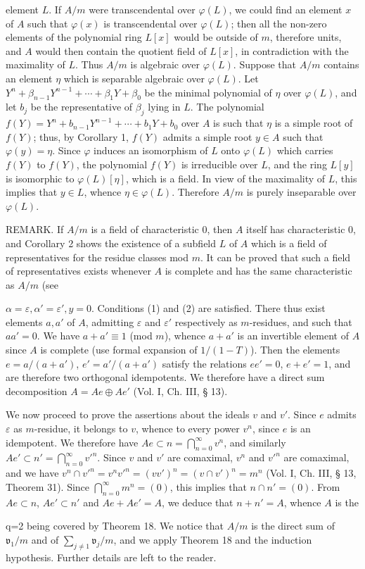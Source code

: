 element $L$. If $A/m$ were transcendental over $\varphi(L)$, we could find an element $x$ of $A$ such that $\varphi(x)$ is transcendental over $\varphi(L)$; then all the non-zero elements of the polynomial ring $L[x]$ would be outside of $m$, therefore units, and $A$ would then contain the quotient field of $L[x]$, in contradiction with the maximality of $L$. Thus $A/m$ is algebraic over $\varphi(L)$. Suppose that $A/m$ contains an element $\eta$ which is separable algebraic over $\varphi(L)$. Let $Y^n + \beta_{n-1} Y^{n-1} + \cdots + \beta_1 Y + \beta_0$ be the minimal polynomial of $\eta$ over $\varphi(L)$, and let $b_j$ be the representative of $\beta_j$ lying in $L$. The polynomial $f(Y) = Y^n + b_{n-1} Y^{n-1} + \cdots + b_1 Y + b_0$ over $A$ is such that $\eta$ is a simple root of $f(Y)$; thus, by Corollary 1, $f(Y)$ admits a simple root $y \in A$ such that $\varphi(y) = \eta$. Since $\varphi$ induces an isomorphism of $L$ onto $\varphi(L)$ which carries $f(Y)$ to $f(Y)$, the polynomial $f(Y)$ is irreducible over $L$, and the ring $L[y]$ is isomorphic to $\varphi(L)[\eta]$, which is a field. In view of the maximality of $L$, this implies that $y \in L$, whence $\eta \in \varphi(L)$. Therefore $A/m$ is purely inseparable over $\varphi(L)$.

REMARK. If $A/m$ is a field of characteristic 0, then $A$ itself has characteristic 0, and Corollary 2 shows the existence of a subfield $L$ of $A$ which is a field of representatives for the residue classes mod $m$. It can be proved that such a field of representatives exists whenever $A$ is complete and has the same characteristic as $A/m$ (see

$\alpha = \varepsilon, \alpha' = \varepsilon', y = 0$. Conditions (1) and (2) are satisfied. There thus exist elements $a, a'$ of $A$, admitting $\varepsilon$ and $\varepsilon'$ respectively as $m$-residues, and such that $aa' = 0$. We have $a + a' \equiv 1$ (mod $m$), whence $a + a'$ is an invertible element of $A$ since $A$ is complete (use formal expansion of $1/(1-T)$). Then the elements $e = a/(a + a')$, $e' = a'/(a + a')$ satisfy the relations $ee' = 0$, $e + e' = 1$, and are therefore two orthogonal idempotents. We therefore have a direct sum decomposition $A = Ae \oplus Ae'$ (Vol. I, Ch. III, § 13).

We now proceed to prove the assertions about the ideals $v$ and $v'$. Since $e$ admits $\varepsilon$ as $m$-residue, it belongs to $v$, whence to every power $v^n$, since $e$ is an idempotent. We therefore have $Ae \subset n = \bigcap_{n=0}^{\infty} v^n$, and similarly $Ae' \subset n' = \bigcap_{n=0}^{\infty} v'^n$. Since $v$ and $v'$ are comaximal, $v^n$ and $v'^n$ are comaximal, and we have $v^n \cap v'^n = v^n v'^n = (vv')^n = (v \cap v')^n = m^n$ (Vol. I, Ch. III, § 13, Theorem 31). Since $\bigcap_{n=0}^{\infty} m^n = (0)$, this implies that $n \cap n' = (0)$. From $Ae \subset n$, $Ae' \subset n'$ and $Ae + Ae' = A$, we deduce that $n + n' = A$, whence $A$ is the

q=2 being covered by Theorem 18. We notice that $A/m$ is the direct sum of $\mathfrak{v}_1/m$ and of $\sum_{j \neq 1} \mathfrak{v}_j/m$, and we apply Theorem 18 and the induction hypothesis. Further details are left to the reader.